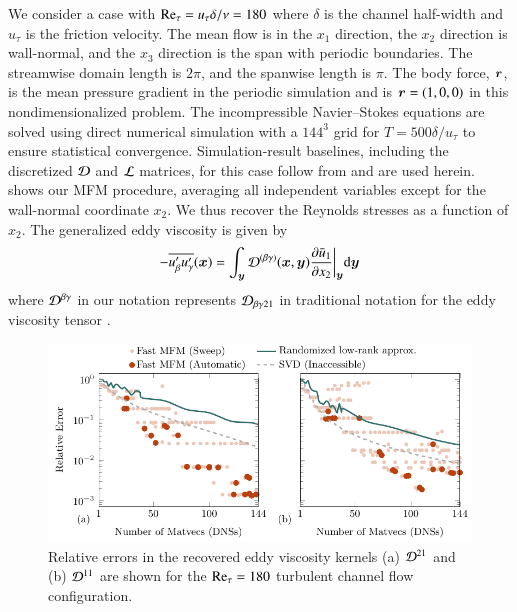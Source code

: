We consider a case with $\mbox{\text{Re}}_\tau = u_\tau \delta / \nu = 180$ where $\delta$ is the channel half-width and $u_\tau$ is the friction velocity.
The mean flow is in the $x_1$ direction, the $x_2$ direction is wall-normal, and the $x_3$ direction is the span with periodic boundaries.
The streamwise domain length is $2\pi$, and the spanwise length is $\pi$.
The body force, $\bm{r}$, is the mean pressure gradient in the periodic simulation and is $\bm{r}=(1,0,0)$ in this nondimensionalized problem. 
The incompressible Navier--Stokes equations are solved using direct numerical simulation with a $144^3$ grid for $T = 500 \delta/u_\tau$ to ensure statistical convergence.
Simulation-result baselines, including the discretized $\mathcal{D}$ and $\mathcal{L}$ matrices, for this case follow from \citet{park21} and are used herein.
 shows our MFM procedure, averaging all independent variables except for the wall-normal coordinate $x_2$.
We thus recover the Reynolds stresses as a function of $x_2$. The generalized eddy viscosity is given by
\begin{gather}
    - \overline{ u_\beta^\prime u_\gamma^\prime } (\bm{x}) = 
    \int_{\bm{y}} \mathcal{D}^{(\beta\gamma)} (\bm{x},\bm{y})
    \frac{ \partial \bar{u}_1}{\partial x_2} {\bigg|}_{\bm{y}} \text{d} \bm{y}
\end{gather}
where $\mathcal{D}^{\beta\gamma}$ in our notation represents $\mathcal{D}_{\beta\gamma21}$ in traditional notation for the eddy viscosity tensor \cite{hamba2005nonlocal}.

\begin{figure}
    \centering
    \includegraphics[scale=1]{figures/err-peel-turbulent.pdf}
    \caption{
        Relative errors in the recovered eddy viscosity kernels (a) $\mathcal{D}^{21}$ and (b) $\mathcal{D}^{11}$ are shown for the $\mbox{\text{Re}}_\tau = 180$ turbulent channel flow configuration.
    }
    \label{f:error_peeeling_turb}
\end{figure}

